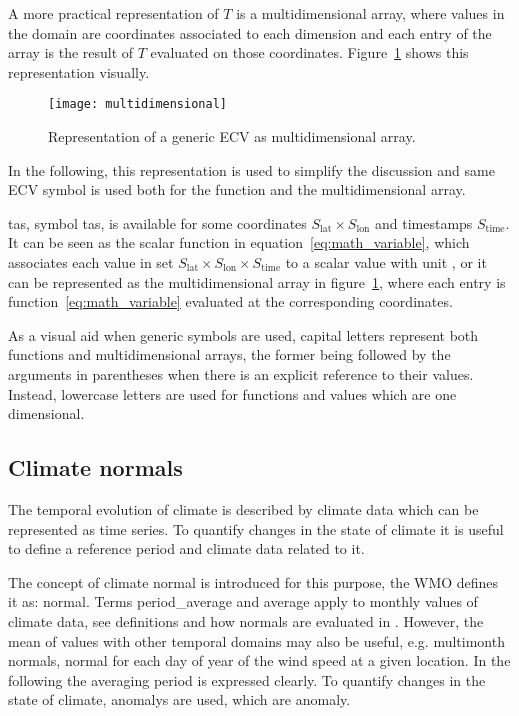 A more practical representation of $T$ is a multidimensional array, where values in the domain are coordinates associated to each dimension and each entry of the array is the result of $T$ evaluated on those coordinates. Figure~\ref{fig:multidimensional} shows this representation visually.
\begin{figure}[h]
  \centering
  \texttt{[image: multidimensional]}
  \caption{Representation of a generic \gls{ECV} as multidimensional array.}
  \label{fig:multidimensional}
\end{figure}
In the following, this representation is used to simplify the discussion and same \gls{ECV} symbol is used both for the function and the multidimensional array.
\begin{example}
  \Glsdesc{tas}, symbol \gls{tas}, is available for some coordinates $S_\text{lat} \times S_\text{lon}$ and timestamps $S_\text{time}$. It can be seen as the scalar function in equation~\eqref{eq:math_variable}, which associates each value in set $S_\text{lat} \times S_\text{lon} \times S_\text{time}$ to a scalar value with unit , or it can be represented as the multidimensional array in figure~\ref{fig:multidimensional}, where each entry is function~\eqref{eq:math_variable} evaluated at the corresponding coordinates.
\end{example}

As a visual aid when generic symbols are used, capital letters represent both functions and multidimensional arrays, the former being followed by the arguments in parentheses when there is an explicit reference to their values. Instead, lowercase letters are used for functions and values which are one dimensional.



\subsection{Climate normals}
\label{sec:Climate normals}
The temporal evolution of climate is described by climate data which can be represented as time series. To quantify changes in the state of climate it is useful to define a reference period and climate data related to it.

The concept of climate \gls{normal} is introduced for this purpose, the \gls{WMO} defines it as: \glsdesc{normal}. Terms \gls{period_average} and \gls{average} apply to monthly values of climate data, see definitions and how normals are evaluated in \cite[5-6]{2017WorldMeteorologicalOrganizationWMOWMOGuidelines}. However, the mean of values with other temporal domains may also be useful, e.g. multimonth normals, normal for each day of year of the wind speed at a given location. In the following the averaging period is expressed clearly.
To quantify changes in the state of climate, \glspl{anomaly} are used, which are \glsdesc{anomaly}.

